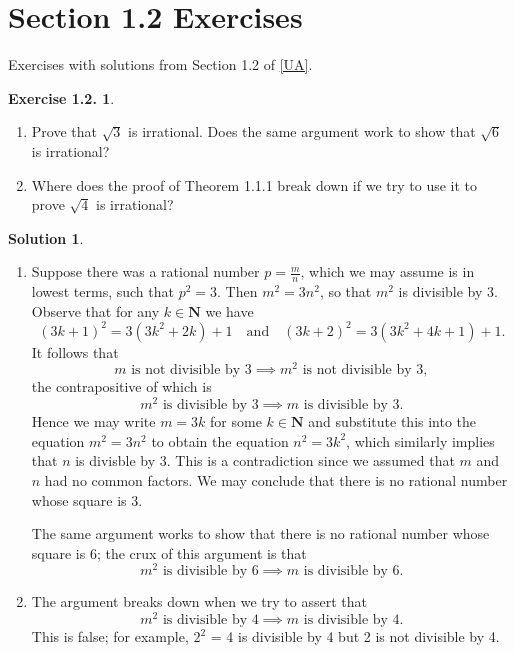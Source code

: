 \documentclass[12pt]{article}
\theoremstyle{definition}
\theoremstyle{exercise}
\newtheorem{exercise}{Exercise 1.2.}
\theoremstyle{solution}
\newtheorem*{solution}{Solution}
\begin{document}
\section{Section 1.2 Exercises}

Exercises with solutions from Section 1.2 of \hyperlink{ua}{[UA]}.

\begin{exercise}
\label{ex:1}
    \begin{enumerate}[label = (\alph*)]
        \item Prove that \( \sqrt{3} \) is irrational. Does the same argument work to show that \( \sqrt{6} \) is irrational?

        \item Where does the proof of Theorem 1.1.1 break down if we try to use it to prove \( \sqrt{4} \) is irrational?
    \end{enumerate}
\end{exercise}

\begin{solution}
    \begin{enumerate}[label = (\alph*), listparindent = \parindent, parsep = 0em]
        \item Suppose there was a rational number \( p = \tfrac{m}{n} \), which we may assume is in lowest terms, such that \( p^2 = 3 \). Then \( m^2 = 3 n^2 \), so that \( m^2 \) is divisible by 3. Observe that for any \( k \in \mathbf{N} \) we have
        \[
            (3k + 1)^2 = 3(3k^2 + 2k) + 1 \quad \text{and} \quad (3k + 2)^2 = 3(3k^2 + 4k + 1) + 1.
        \]
        It follows that
        \[
            m \text{ is not divisible by 3} \implies m^2 \text{ is not divisible by 3},
        \]
        the contrapositive of which is
        \[
            m^2 \text{ is divisible by 3} \implies m \text{ is divisible by 3}.
        \]
        Hence we may write \( m = 3k \) for some \( k \in \mathbf{N} \) and substitute this into the equation \( m^2 = 3 n^2 \) to obtain the equation \( n^2 = 3 k^2 \), which similarly implies that \( n \) is divisble by 3. This is a contradiction since we assumed that \( m \) and \( n \) had no common factors. We may conclude that there is no rational number whose square is 3.

        The same argument works to show that there is no rational number whose square is 6; the crux of this argument is that
        \[
            m^2 \text{ is divisible by 6} \implies m \text{ is divisible by 6}.
        \]

        \item The argument breaks down when we try to assert that
        \[
            m^2 \text{ is divisible by 4} \implies m \text{ is divisible by 4}.
        \]
        This is false; for example, \( 2^2 \) = 4 is divisible by 4 but 2 is not divisible by 4.
    \end{enumerate}
\end{solution}
\end{document}
